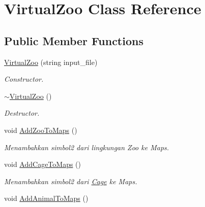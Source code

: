 \hypertarget{classVirtualZoo}{\section{Virtual\-Zoo Class Reference}
\label{classVirtualZoo}
}
\subsection*{Public Member Functions}
\begin{DoxyCompactItemize}
\item 
\hyperlink{classVirtualZoo_af15dc6a722e1b16fdd7de94397eb3cb0}{Virtual\-Zoo} (string input\-\_\-file)
\begin{DoxyCompactList}\small\item\em Constructor. \end{DoxyCompactList}\item 
\hypertarget{classVirtualZoo_aa056be888d35090cb069ae927eebd155}{\hyperlink{classVirtualZoo_aa056be888d35090cb069ae927eebd155}{$\sim$\-Virtual\-Zoo} ()}\label{classVirtualZoo_aa056be888d35090cb069ae927eebd155}

\begin{DoxyCompactList}\small\item\em Destructor. \end{DoxyCompactList}\item 
\hypertarget{classVirtualZoo_aede45668a64ab5584e7638bc36ef402c}{void \hyperlink{classVirtualZoo_aede45668a64ab5584e7638bc36ef402c}{Add\-Zoo\-To\-Maps} ()}\label{classVirtualZoo_aede45668a64ab5584e7638bc36ef402c}

\begin{DoxyCompactList}\small\item\em Menambahkan simbol2 dari lingkungan Zoo ke Maps. \end{DoxyCompactList}\item 
\hypertarget{classVirtualZoo_a9407965a86c0ed84605591738fd167b6}{void \hyperlink{classVirtualZoo_a9407965a86c0ed84605591738fd167b6}{Add\-Cage\-To\-Maps} ()}\label{classVirtualZoo_a9407965a86c0ed84605591738fd167b6}

\begin{DoxyCompactList}\small\item\em Menambahkan simbol2 dari \hyperlink{classCage}{Cage} ke Maps. \end{DoxyCompactList}\item 
\hypertarget{classVirtualZoo_a6819f43e07f1d3f4a616cce03f415389}{void \hyperlink{classVirtualZoo_a6819f43e07f1d3f4a616cce03f415389}{Add\-Animal\-To\-Maps} ()}\label{classVirtualZoo_a6819f43e07f1d3f4a616cce03f415389}


\end{DoxyCompactItemize}
